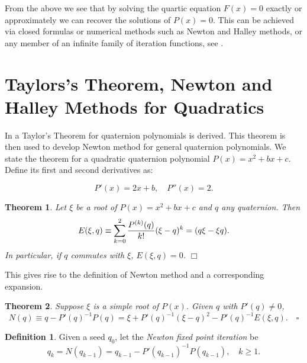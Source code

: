 \documentclass{article}
\newtheorem{thm}{Theorem}
\theoremstyle{definition}
\newtheorem{definition}{Definition}
\begin{document}
From the above we see that by solving the quartic equation
$F(x)=0$ exactly or approximately we can recover the solutions of
$P(x)=0$. This can be achieved via closed formulas or numerical
methods such as Newton and  Halley methods, or any member of
an infinite family of iteration functions, see \cite{kalbook}.



\section{Taylors's Theorem, Newton and Halley Methods for Quadratics} \label{sectionVIII}

In \cite{kalQ} a Taylor's Theorem for quaternion polynomials is derived. This theorem is then used to develop Newton method for general quaternion polynomials.  We state the theorem for
a quadratic  quaternion polynomial $P(x)=x^2+bx+c$. Define its first and second derivatives as:

\begin{equation}
P'(x)=2x+b,  \quad P''(x)=2.
\end{equation}

\begin{thm} \label{Expansion} Let $\xi$ be a root of $P(x)=x^2+bx+c$ and $q$ any quaternion. Then
\begin{equation} \label{T15eqn.p1}
E(\xi, q) \equiv \sum_{k=0}^2 {{P^{(k)}(q)} \over {k!}} (\xi - q)^k= (q \xi - \xi q).
\end{equation}
In particular, if $q$ commutes with $\xi$,  $E(\xi, q)=0$. $\Box$
\end{thm}

This gives rise to the definition of Newton method and a corresponding expansion.

\begin{thm} \label{Newt}  Suppose $\xi$ is a simple root of $P(x)$. Given $q$ with $P'(q) \not =0$,
\begin{equation} \label{T15eqn.p3}
N(q) \equiv q- P'(q)^{-1}P(q)=
 \xi + P'(q)^{-1} (\xi -q)^2 - P'(q)^{-1} E(\xi, q). \quad \square
\end{equation}
\end{thm}

\begin{definition} \label{defNewt}
Given a seed $q_0$, let the {\it Newton fixed point iteration} be
\begin{equation}
q_{k}=N(q_{k-1})=q_{k-1}- P'(q_{k-1})^{-1}P(q_{k-1}), \quad k \geq 1.
\end{equation}
\end{definition}
\end{document}
